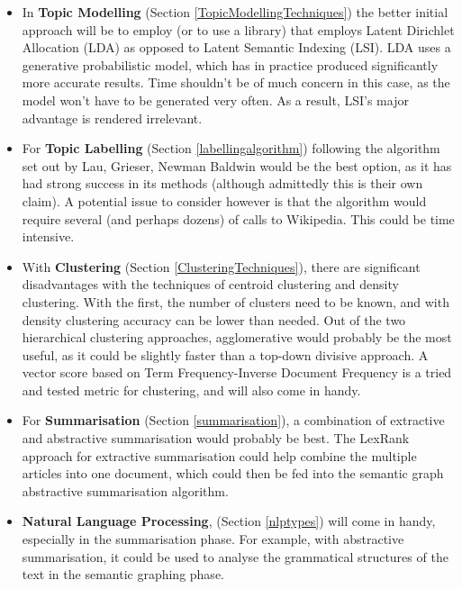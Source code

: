 \documentclass[12pt]{article}
\begin{document}
\begin{itemize}
	\item In \textbf{Topic Modelling} (Section \ref{TopicModellingTechniques}) the better initial approach will be to employ (or to use a library) that employs Latent Dirichlet Allocation (LDA) as opposed to Latent Semantic Indexing (LSI). LDA uses a generative probabilistic model, which has in practice produced significantly more accurate results. Time shouldn't be of much concern in this case, as the model won't have to be generated very often. As a result, LSI's major advantage is rendered irrelevant.
	\item For \textbf{Topic Labelling} (Section \ref{labellingalgorithm}) following the algorithm set out by Lau, Grieser, Newman Baldwin would be the best option, as it has had strong success in its methods (although admittedly this is their own claim). A potential issue to consider however is that the algorithm would require several (and perhaps dozens) of calls to Wikipedia. This could be time intensive.
	\item With \textbf{Clustering} (Section \ref{ClusteringTechniques}), there are significant disadvantages with the techniques of centroid clustering and density clustering. With the first, the number of clusters need to be known, and with density clustering accuracy can be lower than needed. Out of the two hierarchical clustering approaches, agglomerative would probably be the most useful, as it could be slightly faster than a top-down divisive approach. A vector score based on Term Frequency-Inverse Document Frequency is a tried and tested metric for clustering, and will also come in handy.
	\item For \textbf{Summarisation} (Section \ref{summarisation}), a combination of extractive and abstractive summarisation would probably be best. The LexRank approach for extractive summarisation could help combine the multiple articles into one document, which could then be fed into the semantic graph abstractive summarisation algorithm.
	\item \textbf{Natural Language Processing}, (Section \ref{nlptypes}) will come in handy, especially in the summarisation phase. For example, with abstractive summarisation, it could be used to analyse the grammatical structures of the text in the semantic graphing phase.  
\end{itemize}

\end{document}
